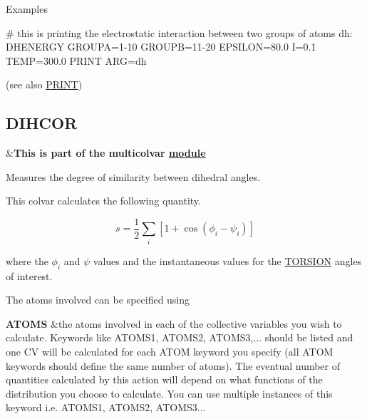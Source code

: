 \begin{DoxyParagraph}{Examples}
\begin{DoxyVerb}# this is printing the electrostatic interaction between two groups of atoms
dh: DHENERGY GROUPA=1-10 GROUPB=11-20 EPSILON=80.0 I=0.1 TEMP=300.0
PRINT ARG=dh
\end{DoxyVerb}
 (see also \hyperlink{PRINT}{P\+R\+I\+N\+T}) 
\end{DoxyParagraph}
\hypertarget{DIHCOR}{}\subsection{D\+I\+H\+C\+O\+R}\label{DIHCOR}
\begin{TabularC}{2}
\hline
&{\bfseries  This is part of the multicolvar \hyperlink{mymodules}{module }}   \\
\end{TabularC}
Measures the degree of similarity between dihedral angles.

This colvar calculates the following quantity.

\[ s = \frac{1}{2} \sum_i \left[ 1 + \cos( \phi_i - \psi_i ) \right] \]

where the $\phi_i$ and $\psi$ values and the instantaneous values for the \hyperlink{TORSION}{T\+O\+R\+S\+I\+O\+N} angles of interest.

\begin{DoxyParagraph}{The atoms involved can be specified using}

\end{DoxyParagraph}
\begin{TabularC}{2}
\hline
{\bfseries  A\+T\+O\+M\+S } &the atoms involved in each of the collective variables you wish to calculate. Keywords like A\+T\+O\+M\+S1, A\+T\+O\+M\+S2, A\+T\+O\+M\+S3,... should be listed and one C\+V will be calculated for each A\+T\+O\+M keyword you specify (all A\+T\+O\+M keywords should define the same number of atoms). The eventual number of quantities calculated by this action will depend on what functions of the distribution you choose to calculate. You can use multiple instances of this keyword i.\+e. A\+T\+O\+M\+S1, A\+T\+O\+M\+S2, A\+T\+O\+M\+S3...   \\
\end{TabularC}


